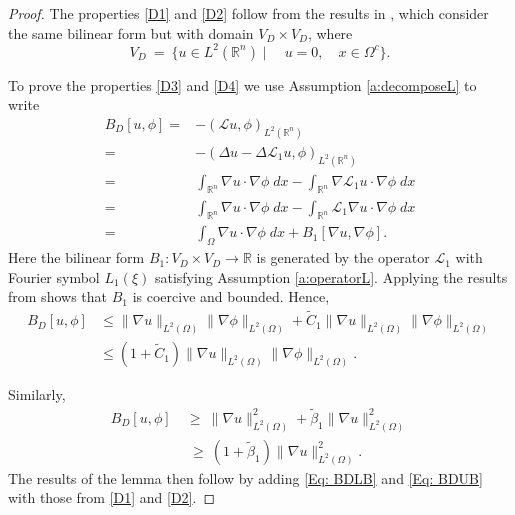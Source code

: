 \documentclass[11pt]{amsart}   	%
\theoremstyle{plain}
\numberwithin{equation}{section}
\def\R{\mathbb{R}}
\begin{document}
\begin{proof}
The properties \ref{D1} and \ref{D2} follow from the results in \cite{cappanera2024analysis}, which consider the same bilinear form but with domain $V_D \times V_D$, where
 \begin{equation}\label{Eq: VDDef}
 V_D \ = \ \{ u \in L^2(\R^n) \mid \quad u =0, \quad x \in \Omega^c\}.
 \end{equation}

To prove the properties \ref{D3} and \ref{D4} we use Assumption \ref{a:decomposeL} to write
\begin{equation}\label{Eq: DecomposeL1}
\begin{aligned}
B_D[u,\phi] = & - (\mathcal{L}u, \phi)_{L^2(\R^n)}\\
= & - (\Delta u - \Delta \mathcal{L}_1u, \phi)_{L^2(\R^n)}\\
= & \int_{\R^n} \nabla u \cdot \nabla \phi \;dx   - \int_{\R^n} \nabla \mathcal{L}_1 u \cdot \nabla \phi \;dx\\
= &   \int_{\R^n} \nabla u \cdot \nabla \phi \;dx - \int_{\R^n}  \mathcal{L}_1 \nabla u \cdot \nabla \phi \;dx\\
= &   \int_{\Omega} \nabla u \cdot \nabla \phi \;dx + B_1[ \nabla u , \nabla \phi ] .
\end{aligned}
\end{equation}
Here the bilinear form $B_1: V_D \times V_D \longrightarrow \R$ is generated by the operator $\mathcal{L}_1$ with Fourier symbol $L_1(\xi)$ satisfying Assumption \ref{a:operatorL}. Applying the results from  \cite[Lemma 2.3]{cappanera2024analysis} shows that $B_1$ is coercive and bounded. Hence,
\begin{equation}\label{Eq: BDLB}
\begin{aligned}
B_D[u,\phi] & \leq  \| \nabla u\|_{L^2(\Omega)}  \| \nabla \phi \|_{L^2(\Omega)}  + \tilde{C}_1 \| \nabla u\|_{L^2(\Omega)}  \| \nabla \phi \|_{L^2(\Omega)} \\
& \leq  (1+ \tilde{C}_1)   \| \nabla u\|_{L^2(\Omega)}  \| \nabla \phi \|_{L^2(\Omega)}. 
\end{aligned}
\end{equation}

Similarly,
\begin{equation}\label{Eq: BDUB}
\begin{aligned}
B_D[u,\phi] \ & \geq \ \| \nabla u\|^2_{L^2(\Omega)} + \tilde{\beta}_1 \| \nabla u\|^2_{L^2(\Omega)}  \\
& \ \geq \ (1+ \tilde{\beta}_1)   \| \nabla u\|^2_{L^2(\Omega)}. 
\end{aligned}
\end{equation}
The results of the lemma then follow by adding \eqref{Eq: BDLB} and \eqref{Eq: BDUB} with those from \ref{D1} and \ref{D2}.

\end{proof}
\end{document}
